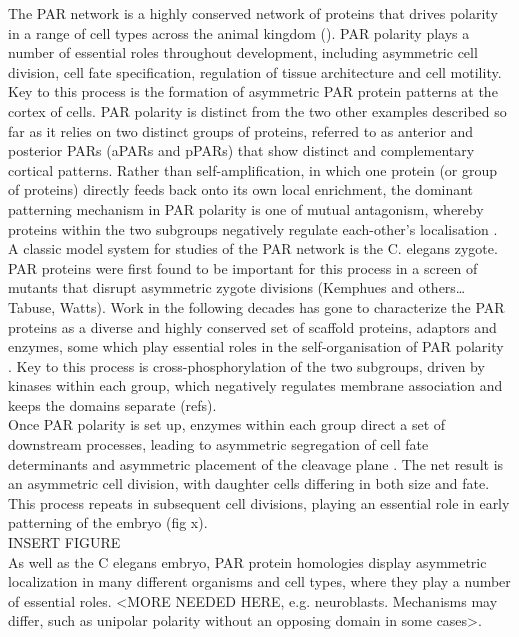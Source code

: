 \documentclass[12pt]{"article"}
\begin{document}
The PAR network is a highly conserved network of proteins that drives polarity in a range of cell types across the animal kingdom (\cite{Goldstein2007}). PAR polarity plays a number of essential roles throughout development, including asymmetric cell division, cell fate specification, regulation of tissue architecture and cell motility. Key to this process is the formation of asymmetric PAR protein patterns at the cortex of cells. PAR polarity is distinct from the two other examples described so far as it relies on two distinct groups of proteins, referred to as anterior and posterior PARs (aPARs and pPARs) that show distinct and complementary cortical patterns. Rather than self-amplification, in which one protein (or group of proteins) directly feeds back onto its own local enrichment, the dominant patterning mechanism in PAR polarity is one of mutual antagonism, whereby proteins within the two subgroups negatively regulate each-other’s localisation \parencite{Goehring2011b}. \\

A classic model system for studies of the PAR network is the C. elegans zygote. PAR proteins were first found to be important for this process in a screen of mutants that disrupt asymmetric zygote divisions (Kemphues and others… Tabuse, Watts). Work in the following decades has gone to characterize the PAR proteins as a diverse and highly conserved set of scaffold proteins, adaptors and enzymes, some which play essential roles in the self-organisation of PAR polarity \parencite{Lang2017}. Key to this process is cross-phosphorylation of the two subgroups, driven by kinases within each group, which negatively regulates membrane association and keeps the domains separate (refs).\\

Once PAR polarity is set up, enzymes within each group direct a set of downstream processes, leading to asymmetric segregation of cell fate determinants \citep{Cuenca2003, Daniels2010, Griffin2011, Wu2018} and asymmetric placement of the cleavage plane \parencite{Bouvrais2018}. The net result is an asymmetric cell division, with daughter cells differing in both size and fate. This process repeats in subsequent cell divisions, playing an essential role in early patterning of the embryo (fig x). \\

INSERT FIGURE \\

As well as the C elegans embryo, PAR protein homologies display asymmetric localization in many different organisms and cell types, where they play a number of essential roles. <MORE NEEDED HERE, e.g. neuroblasts. Mechanisms may differ, such as unipolar polarity without an opposing domain in some cases>.\\
\end{document}
